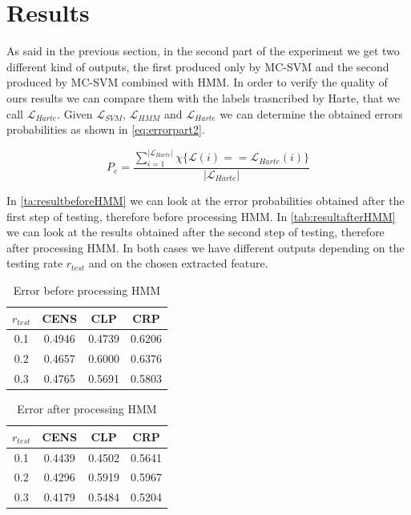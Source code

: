 \section{Results}
\label{sec:results}


As said in the previous section, in the second part of the experiment we get two different kind of outputs, the first produced only by MC-SVM and the second produced by MC-SVM combined with HMM. In order to verify the quality of ours results we can compare them with the labels trasncribed by Harte, that we call $\mathcal{L}_{Harte}$. Given $\mathcal{L}_{SVM}$, $\mathcal{L}_{HMM}$ and $\mathcal{L}_{Harte}$ we can determine the obtained errors probabilities as shown in \eqref{eq:errorpart2}.

\begin{equation}
	P_{e} = \frac{\sum_{i=1}^{|\mathcal{L}_{Harte}|}\chi\{\mathcal{L}(i)==\mathcal{L}_{Harte}(i)\}}{|\mathcal{L}_{Harte}|}
	\label{eq:errorpart2}
\end{equation}



 In \ref{ta:resultbeforeHMM} we can look at the error probabilities obtained after the first step of testing, therefore before processing HMM. In \ref{tab:resultafterHMM} we can look at the results obtained after the second step of testing, therefore after processing HMM. In both cases we have different outputs depending on the testing rate $r_{test}$ and on the chosen extracted feature.

\begin{table}[h!]
	\caption{Error before processing HMM}
	\centering
	\begin{tabular}{|c |c c c|}
	\hline
	$r_{test}$ & CENS & CLP & CRP\\ \hline
	0.1 & 0.4946 & 0.4739 & 0.6206\\
	0.2 & 0.4657 & 0.6000 & 0.6376\\
	0.3 & 0.4765 & 0.5691 & 0.5803\\
	\hline
	\end{tabular}
	\label{tab:resultbeforeHMM}
\end{table}

\begin{table}[h!]
	\caption{Error after processing HMM}
	\centering
	\begin{tabular}{|c |c c c|}
	\hline
	$r_{test}$ & CENS & CLP & CRP\\ \hline
	0.1 & 0.4439 & 0.4502 & 0.5641\\
	0.2 & 0.4296 & 0.5919 & 0.5967\\
	0.3 & 0.4179 & 0.5484 & 0.5204\\
	\hline
	\end{tabular}
	\label{ta:resultafterHMM}
\end{table}

